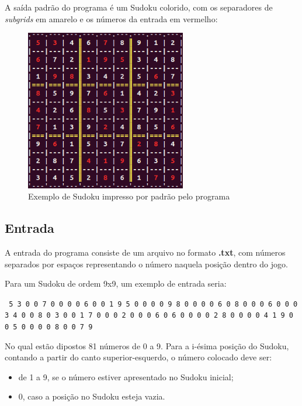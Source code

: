 \documentclass[a4paper]{article}
\begin{document}
    A saída padrão do programa é um Sudoku colorido, com os separadores
    de \emph{subgrids} em amarelo e os números da entrada em vermelho:
    
    \bigskip
    \begin{figure}[ht!] 
      \centering
      \includegraphics[width=70mm]{Sudoku.png}
      \caption{Exemplo de Sudoku impresso por padrão pelo programa} 
      \label{fig:sudoku}
    \end{figure}
    
  \subsection{Entrada}
  \label{subsec:entrada}
    
    A entrada do programa consiste de um arquivo no formato \textbf{.txt},
    com números separados por espaços representando o número naquela 
    posição dentro do jogo. 
    
    Para um Sudoku de ordem 9x9, um exemplo de entrada seria:
    
    \bigskip
    \texttt
    {
        5 3 0 0 7 0 0 0 0 6 0 0 1 9 5 0 0 0 0 9 8 0 0 0 0 6 0 8 0 0 0 6 0 0 
        0 3 4 0 0 8 0 3 0 0 1 7 0 0 0 2 0 0 0 6 0 6 0 0 0 0 2 8 0 0 0 0 4 1 
        9 0 0 5 0 0 0 0 8 0 0 7 9
    }
    \bigskip
    
    No qual estão dipostos 81 números de 0 a 9. Para a i-ésima posição do
    Sudoku, contando a partir do canto superior-esquerdo, o número colocado
    deve ser:
    \begin{itemize}
      \item de 1 a 9, se o número estiver apresentado no Sudoku inicial;
      \item 0, caso a posição no Sudoku esteja vazia.
    \end{itemize}
    
\end{document}
